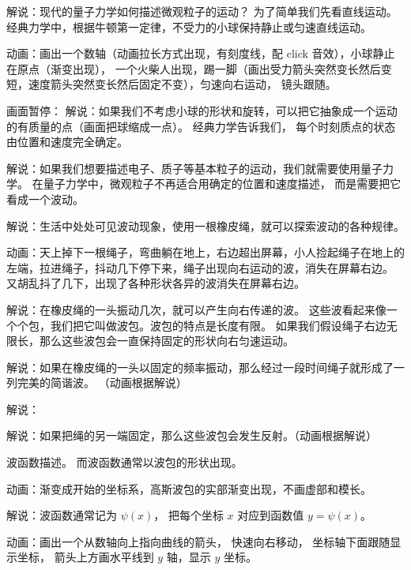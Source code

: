 
\begin{issues}
\issueDraft
\end{issues}




解说：现代的量子力学如何描述微观粒子的运动？ 为了简单我们先看直线运动。 经典力学中，根据牛顿第一定律，不受力的小球保持静止或匀速直线运动。

动画：画出一个数轴（动画拉长方式出现，有刻度线，配 click 音效），小球静止在原点（渐变出现）， 一个火柴人出现，踢一脚（画出受力箭头突然变长然后变短，速度箭头突然变长然后固定不变），匀速向右运动， 镜头跟随。

画面暂停： 解说：如果我们不考虑小球的形状和旋转，可以把它抽象成一个运动的有质量的点（画面把球缩成一点）。 经典力学告诉我们， 每个时刻质点的状态由位置和速度完全确定。

解说：如果我们想要描述电子、质子等基本粒子的运动，我们就需要使用量子力学。 在量子力学中，微观粒子不再适合用确定的位置和速度描述， 而是需要把它看成一个波动。

解说：生活中处处可见波动现象，使用一根橡皮绳，就可以探索波动的各种规律。

动画：天上掉下一根绳子，弯曲躺在地上，右边超出屏幕，小人捡起绳子在地上的左端，拉进绳子，抖动几下停下来，绳子出现向右运动的波，消失在屏幕右边。 又胡乱抖了几下，出现了各种形状各异的波消失在屏幕右边。

解说：在橡皮绳的一头振动几次，就可以产生向右传递的波。 这些波看起来像一个个包，我们把它叫做波包。波包的特点是长度有限。 如果我们假设绳子右边无限长，那么这些波包会一直保持固定的形状向右匀速运动。

解说：如果在橡皮绳的一头以固定的频率振动，那么经过一段时间绳子就形成了一列完美的简谐波。
（动画根据解说）

解说：

解说：如果把绳的另一端固定，那么这些波包会发生反射。（动画根据解说）




波函数描述。 而波函数通常以波包的形状出现。

动画：渐变成开始的坐标系，高斯波包的实部渐变出现，不画虚部和模长。

解说：波函数通常记为 $\psi(x)$， 把每个坐标 $x$ 对应到函数值 $y = \psi(x)$。

动画：画出一个从数轴向上指向曲线的箭头， 快速向右移动， 坐标轴下面跟随显示坐标， 箭头上方画水平线到 $y$ 轴，显示 $y$ 坐标。

